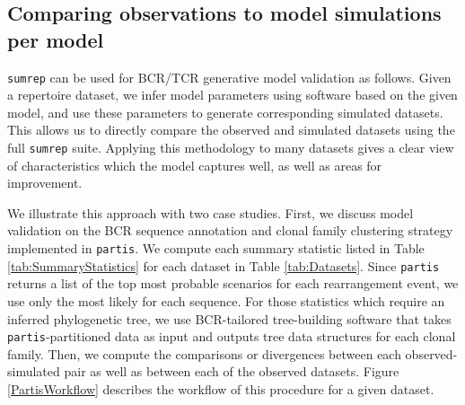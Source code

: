 \documentclass{article}
\begin{document}
\subsection*{Comparing observations to model simulations per model}
\texttt{sumrep} can be used for BCR/TCR generative model validation as follows.
Given a repertoire dataset, we infer model parameters using software based on the given model, and use these parameters to generate corresponding simulated datasets.
This allows us to directly compare the observed and simulated datasets using the full \texttt{sumrep} suite.
Applying this methodology to many datasets gives a clear view of characteristics which the model captures well, as well as areas for improvement.

We illustrate this approach with two case studies.
First, we discuss model validation on the BCR sequence annotation and clonal family clustering strategy implemented in \texttt{partis}\cite{Ralph2016-nw, Ralph2016-iz}.
We compute each summary statistic listed in Table \ref{tab:SummaryStatistics} for each dataset in Table \ref{tab:Datasets}.
Since \texttt{partis} returns a list of the top most probable scenarios for each rearrangement event, we use only the most likely for each sequence.
For those statistics which require an inferred phylogenetic tree, we use BCR-tailored tree-building software that takes \texttt{partis}-partitioned data as input and outputs tree data structures for each clonal family.
Then, we compute the comparisons or divergences between each observed-simulated pair as well as between each of the observed datasets.
Figure \ref{PartisWorkflow} describes the workflow of this procedure for a given dataset.
\end{document}
